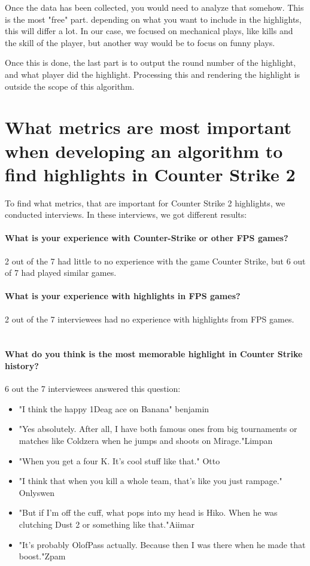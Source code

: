 Once the data has been collected, you would need to analyze that somehow. This is the most "free" part. depending on what you want to include in the highlights, this will differ a lot. In our case, we focused on mechanical plays, like kills and the skill of the player, but another way would be to focus on funny plays.

Once this is done, the last part is to output the round number of the highlight, and what player did the highlight. Processing this and rendering the highlight is outside the scope of this algorithm.
\section{What metrics are most important when developing an algorithm to find highlights in Counter Strike 2}
To find what metrics, that are important for Counter Strike 2 highlights, we conducted interviews. In these interviews, we got different results:
\paragraph{What is your experience with Counter-Strike or other FPS games?}
2 out of the 7 had little to no experience with the game Counter Strike, but 6 out of 7 had played similar games.
\paragraph{What is your experience with highlights in FPS games?}
2 out of the 7 interviewees had no experience with highlights from FPS games.\\\\
\paragraph{What do you think is the most memorable highlight in Counter Strike history?}
6 out the 7 interviewees answered this question:
\begin{itemize}
    \item "I think the happy 1Deag ace on Banana" {benjamin}
    \item "Yes absolutely. After all, I have both famous ones from big tournaments or matches like Coldzera when he jumps and shoots on Mirage."{Limpan}
    \item "When you get a four K. It's cool stuff like that." {Otto}
    \item "I think that when you kill a whole team, that's like you just rampage." {Onlyswen}
    \item "But if I'm off the cuff, what pops into my head is Hiko. When he was clutching Dust 2 or something like that."{Aiimar}
    \item "It's probably OlofPass actually. Because then I was there when he made that boost."{Zpam}
\end{itemize}
